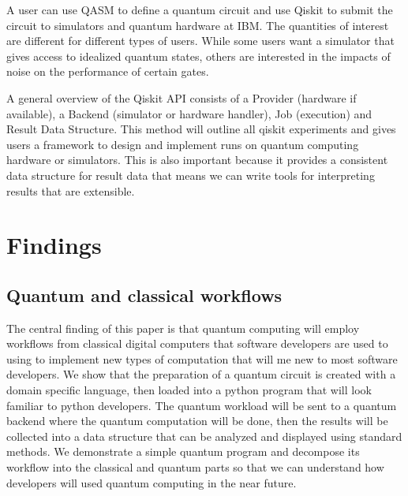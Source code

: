 \documentclass{article}
\begin{document}
A user can use QASM to define a quantum circuit and use Qiskit to submit the circuit to simulators and quantum hardware at IBM. The quantities of interest are different for different types of users. While some users want a simulator that gives access to idealized quantum states, others are interested in the impacts of noise on the performance of certain gates.

A general overview of the Qiskit API consists of a Provider (hardware if available), a Backend (simulator or hardware handler), Job (execution) and Result Data Structure. This method will outline all qiskit experiments and gives users a framework to design and implement runs on quantum computing hardware or simulators. This is also important because it provides a consistent data structure for result data that means we can write tools for interpreting results that are extensible.

\section{Findings}

\subsection{Quantum and classical workflows}

The central finding of this paper is that quantum computing will employ workflows from classical digital computers that software developers are used to using to implement new types of computation that will me new to most software developers. We show that the preparation of a quantum circuit is created with a domain specific language, then loaded into a python program that will look familiar to python developers. The quantum workload will be sent to a quantum backend where the quantum computation will be done, then the results will be collected into a data structure that can be analyzed and displayed using standard methods. We demonstrate a simple quantum program and decompose its workflow into the classical and quantum parts so that we can understand how developers will used quantum computing in the near future.
\end{document}
